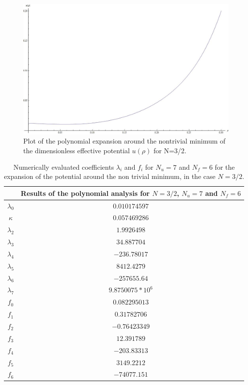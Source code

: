 \begin{figure}
\begin{center}
\includegraphics[scale=0.25]{Immagini/plotuN1.jpg}
\caption{Plot of the polynomial expansion around the nontrivial minimum of the dimensionless effective potential $u(\rho)$ for N=3/2.}
\label{fig:plotfN1}
\end{center}
\end{figure}

\begin{table}
  \begin{center}
    \begin{small}
      \begin{tabular}{|c|c|}
 \hline 
 &   \textbf{Results of the polynomial analysis for $N=3/2$, $N_u = 7$ and $N_f = 6$} \\ \hline 
$\lambda_0$ & $0.010174597$  \\ \hline
$\kappa$ & $0.057469286$ \\ \hline 
$\lambda_2$ & $1.9926498$ \\ \hline 
$\lambda_3$ & $34.887704$ \\ \hline 
$\lambda_4$ & $-236.78017$ \\ \hline 
$\lambda_5$ & $8412.4279$ \\ \hline 
$\lambda_6$ &  $-257655.64$ \\ \hline 
$\lambda_7$ &  $9.8750075*10^6$\\ \hline 
$f_0$ & $  0.082295013$ \\ \hline 
$f_1$ & $0.31782706$ \\ \hline 
$f_2$ & $  -0.76423349$ \\ \hline 
$f_3$ & $12.391789$ \\ \hline 
$f_4$ & $-203.83313$ \\ \hline 
$f_5$ & $3149.2212$ \\ \hline 
$f_6$ & $-74077.151$ \\ \hline 

\end{tabular}
    \end{small}
  \end{center}
\caption{Numerically evaluated coefficients $\lambda_i$ and $f_i$ for $N_u = 7$ and $N_f=6$ for the expansion of the potential around the non trivial minimum, in the case $N=3/2$.}
\label{tab:poli}
\end{table}



